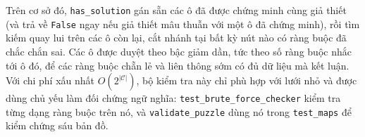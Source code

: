 \begin{sloppypar}
Trên cơ sở đó, \texttt{has\_solution} gán sẵn các ô đã được chứng minh cùng giả
thiết (và trả về \texttt{False} ngay nếu giả thiết mâu thuẫn với một ô đã chứng
minh), rồi tìm kiếm quay lui trên các ô còn lại, cắt nhánh tại bất kỳ nút nào
có ràng buộc đã chắc chắn sai. Các ô được duyệt theo bậc giảm dần, tức theo số
ràng buộc nhắc tới ô đó, để các ràng buộc chẵn lẻ và liên thông sớm có đủ dữ
liệu mà kết luận. Với chi phí xấu nhất $O(2^{|\mathcal{C}|})$, bộ kiểm tra này
chỉ phù hợp với lưới nhỏ và được dùng chủ yếu làm đối chứng ngữ nghĩa:
\texttt{test\_brute\_force\_checker} kiểm tra từng dạng ràng buộc trên nó, và
\texttt{validate\_puzzle} dùng nó trong \texttt{test\_maps} để kiểm chứng sáu
bản đồ.
\end{sloppypar}
